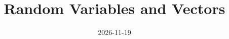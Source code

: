 \documentclass[a4paper,oneside,10pt,ngerman,english]{scrartcl}
\begin{document}
\title{Random Variables and Vectors}
\date{2026-11-19}
\maketitle






\end{document}
